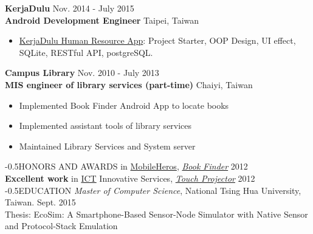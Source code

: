 \documentclass{res}
\makeatletter
\renewcommand{\section}{\@startsection{section}{1}{0mm}
  {-\baselineskip}{0.5\baselineskip}{\bf\leftline}}
\makeatother
\begin{document}
\begin{resume}
	 			{\bf KerjaDulu }                                {\hfill  Nov. 2014 - July 2015}\\
				{\bf Android Development Engineer}			    	 {\hfill Taipei, Taiwan}
		
				\begin{itemize}[leftmargin=*]
					\item {\href{https://play.google.com/store/apps/details?id=com.kerjadulu.kerjadulu&hl=zh_TW}{KerjaDulu Human Resource App}}: Project Starter, OOP Design, UI effect, SQLite, RESTful API, postgreSQL.
				\end{itemize}
				\vspace{-0.12in}

				{\bf Campus Library}                            {\hfill  Nov. 2010 - July 2013}\\
				{\bf MIS engineer of library services (part-time)}            {\hfill Chaiyi, Taiwan}
				\begin{itemize}[leftmargin=*]
					\item Implemented B​ook Finder Android App to locate books
					\vspace{-0.05in} 
					\item Implemented assistant tools of library services
					\vspace{-0.05in}
					\item Maintained Library Services and System server
				\end{itemize}

			\vspace{-0.1in}
			\section{HONORS AND AWARDS}  
			    \vspace{-0.25in}
				 in \href{https://www.mobilehero.com/component/k2/item/209-a2012_11-10.html?Itemid=196}{MobileHeros}, \href{https://www.youtube.com/watch?v=BvLKtrgq_yw}{\sl B​ook Finder} \hfill 2012\\
				{\bf Excellent work} in \href{http://innoserve.tca.org.tw/en/index.aspx}{ICT} Innovative Services, \href{https://www.youtube.com/watch?v=nt4eUAXqXyk}{\sl T​ouch Projector​} \hfill 2012\\  
	
			\vspace{-0.25in}
			\section{EDUCATION}
			\vspace{-0.25in}
				{\sl Master of Computer Science}, National Tsing Hua University, Taiwan. \hfill Sept. 2015\\
				{\footnotesize Thesis: EcoSim: A Smartphone-Based Sensor-Node Simulator with Native Sensor and Protocol-Stack Emulation}


\end{resume}
\end{document}
